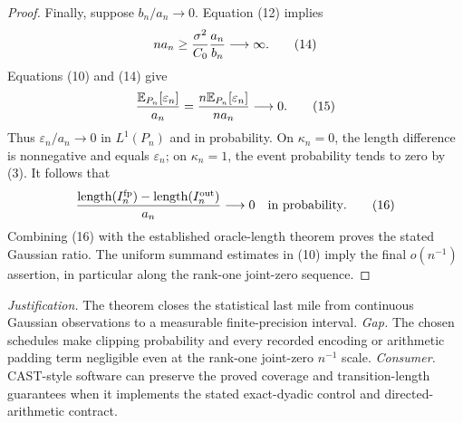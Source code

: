 \documentclass{article}
\begin{document}
\begin{proof}
Finally, suppose \(b_n/a_n\to0\).  Equation (12) implies
\[
na_n\ge{\sigma^2\over C_0}{a_n\over b_n}\longrightarrow\infty.      \tag{14}
\]
Equations (10) and (14) give
\[
{\mathbb E_{P_n}[\varepsilon_n]\over a_n}
={n\mathbb E_{P_n}[\varepsilon_n]\over na_n}\longrightarrow0.      \tag{15}
\]
Thus \(\varepsilon_n/a_n\to0\) in \(L^1(P_n)\) and in probability.  On
\(\kappa_n=0\), the length difference is nonnegative and equals
\(\varepsilon_n\); on \(\kappa_n=1\), the event probability tends to zero by
(3).  It follows that
\[
{\operatorname{length}(I_n^{\mathrm{fp}})
-\operatorname{length}(I_n^{\mathrm{out}})\over a_n}
\longrightarrow0\quad\hbox{in probability}.                         \tag{16}
\]
Combining (16) with the established oracle-length theorem proves the stated
Gaussian ratio.  The uniform summand estimates in (10) imply the final
\(o(n^{-1})\) assertion, in particular along the rank-one joint-zero sequence.
\end{proof}
\par\smallskip\noindent \textit{Justification.} The theorem closes the statistical last mile from continuous Gaussian observations to a measurable finite-precision interval. \textit{Gap.} The chosen schedules make clipping probability and every recorded encoding or arithmetic padding term negligible even at the rank-one joint-zero \(n^{-1}\) scale. \textit{Consumer.} CAST-style software can preserve the proved coverage and transition-length guarantees when it implements the stated exact-dyadic control and directed-arithmetic contract.
\end{document}

